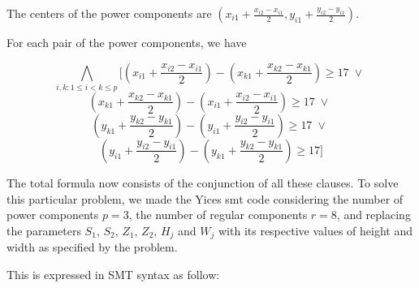 \begin{description}
  The centers of the power components are $(x_{i1} + \frac{x_{i2} - x_{i1}}{2}, y_{i1} + \frac{y_{i2} - y_{i1}}{2} )$.

  For each pair of the power components, we have

  \[  \bigwedge_{i,k: 1 \leq i < k \leq p}
  [ (x_{i1} + \frac{x_{i2} - x_{i1}}{2}) - (x_{k1} + \frac{x_{k2} - x_{k1}}{2}) \geq 17 \; \vee \; \]
  \[ (x_{k1} + \frac{x_{k2} - x_{k1}}{2}) - (x_{i1} + \frac{x_{i2} - x_{i1}}{2}) \geq 17 \; \vee \; \]
  \[ (y_{k1} + \frac{y_{k2} - y_{k1}}{2}) - (y_{i1} + \frac{y_{i2} - y_{i1}}{2}) \geq 17 \; \vee \; \]
  \[ (y_{i1} + \frac{y_{i2} - y_{i1}}{2}) - (y_{k1} + \frac{y_{k2} - y_{k1}}{2}) \geq 17 ] \]


\end{description}

The total formula now consists of the conjunction of all these clauses. To solve this particular problem, we made the Yices smt code considering the number of power components $p=3$, the number of regular components $r=8$, and replacing the parameters $S_1$, $S_2$, $Z_1$, $Z_2$, $H_j$ and $W_j$ with its respective values of height and width as specified by the problem.

This is expressed in SMT syntax as follow:

